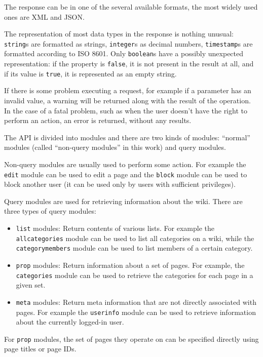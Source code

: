 The response can be in one of the several available formats, the most widely used ones are \ac{XML} and \ac{JSON}.

The representation of most data types in the response is nothing unusual:
\texttt{string}s are formatted as strings, \texttt{integer}s as decimal numbers,
\texttt{timestamp}s are formatted according to ISO 8601.
Only \texttt{boolean}s have a possibly unexpected representation:
if the property is \texttt{false}, it is not present in the result at all,
and if its value is \texttt{true}, it is represented as an empty string.

If there is some problem executing a request, for example if a parameter has an invalid value,
a warning will be returned along with the result of the operation.
In the case of a fatal problem, such as when the user doesn't have the right to perform an action,
an error is returned, without any results.

\medskip

The \ac{API} is divided into modules and there are two kinds of modules:
“normal” modules (called “non-query modules” in this work) and query modules.

Non-query modules are usually used to perform some action.
For example the \texttt{edit} module can be used to edit a page
and the \texttt{block} module can be used to block another user (it can be used only by users with sufficient privileges).

Query modules are used for retrieving information about the wiki. There are three types of query modules:

\begin{itemize}
\item \texttt{list} modules: Return contents of various lists.
For example the \texttt{all\-categories} module can be used to list all categories on a wiki,
while the \texttt{categorymembers} module can be used to list members of a certain category.
\item \texttt{prop} modules: Return information about a set of pages.
For example, the \texttt{categories} module can be used to retrieve the categories for each page in a given set.
\item \texttt{meta} modules: Return meta information that are not directly associated with pages.
For example the \texttt{userinfo} module can be used to retrieve information about the currently logged-in user.
\end{itemize}

For \texttt{prop} modules, the set of pages they operate on can be specified directly using page titles or page IDs.

